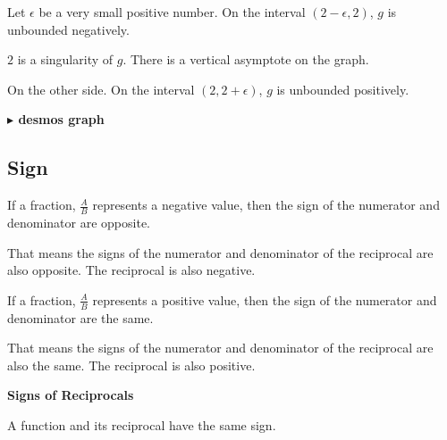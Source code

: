 \documentclass{ximera}
\begin{document}
\begin{example}
Let $\epsilon$ be a very small positive number. On the interval $(2 - \epsilon, 2)$, $g$ is unbounded negatively. 

$2$ is a singularity of $g$.  There is a vertical asymptote on the graph. 




On the other side. On the interval $(2, 2 + \epsilon)$, $g$ is unbounded positively. 










\textbf{\textcolor{blue!55!black}{$\blacktriangleright$ desmos graph}} 
\begin{center}
\end{center}





\end{example}



\subsection*{Sign}


If a fraction, $\frac{A}{B}$ represents a negative value, then the sign of the numerator and denominator are opposite. 

That means the signs of the numerator and denominator of the reciprocal are also opposite.  The reciprocal is also negative. 


If a fraction, $\frac{A}{B}$ represents a positive value, then the sign of the numerator and denominator are the same. 

That means the signs of the numerator and denominator of the reciprocal are also the same.  The reciprocal is also positive.








\begin{fact} \textbf{\textcolor{red!75!green}{Signs of Reciprocals}} 

A function and its reciprocal have the same sign.


\end{fact}
\end{document}
